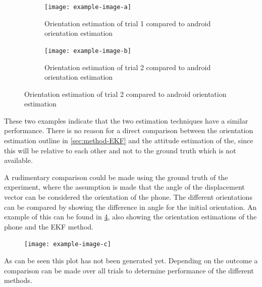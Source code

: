 \begin{figure}[H]
	\centering
	\begin{subfigure}[t]{.45\textwidth}
	\centering
	\texttt{[image: example-image-a]}
	\caption{Orientation estimation of trial 1 compared to android orientation estimation}
	\label{fig:trail1 - shs}
\end{subfigure}\quad
\begin{subfigure}[t]{.45\textwidth}
	\centering
	\texttt{[image: example-image-b]}
	\caption{Orientation estimation of trial 2 compared to android orientation estimation}
	\label{fig:trail2 - shs}
\end{subfigure}
\end{figure}

These two examples indicate that the two estimation techniques have a similar performance. There is no reason for a direct comparison between the orientation estimation outline in \cref{sec:method-EKF} and the attitude estimation of the, since this will be relative to each other and not to the ground truth which is not available. 

A rudimentary comparison could be made using the ground truth of the experiment, where the assumption is made that the angle of the displacement vector can be considered the orientation of the phone. The different orientations can be compared by showing the difference in angle for the initial orientation. An example of this can be found in \cref{fig:orientation_comparison}, also showing the orientation estimations of the phone and the EKF method.

\begin{figure}[H]
	\centering
	\texttt{[image: example-image-c]}
	\caption{}
	\label{fig:orientation_comparison}
\end{figure}


{\color{red}As can be seen this plot has not been generated yet. Depending on the outcome a comparison can be made over all trials to determine performance of the different methods.}

%


